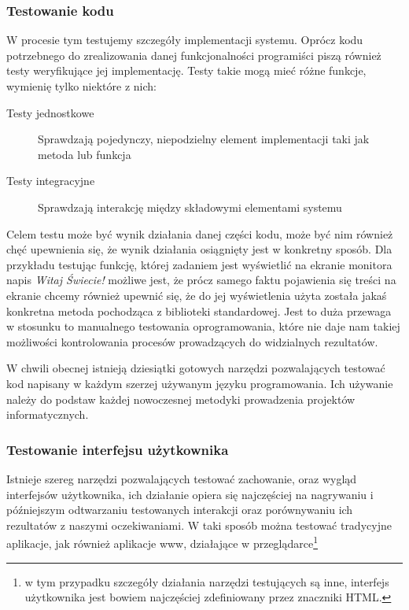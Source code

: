 	    \subsubsection{Testowanie kodu}
	    
	      W procesie tym testujemy szczegóły implementacji systemu. Oprócz kodu potrzebnego do zrealizowania danej funkcjonalności programiści piszą również testy weryfikujące jej implementację. Testy takie mogą mieć różne funkcje, wymienię tylko niektóre z nich:
	      
	      \begin{description}
	        \item[Testy jednostkowe] Sprawdzają pojedynczy, niepodzielny element implementacji taki jak metoda lub funkcja
	        \item[Testy integracyjne] Sprawdzają interakcję między składowymi elementami systemu
        \end{description}
        
        Celem testu może być wynik działania danej części kodu, może być nim również chęć upewnienia się, że wynik działania osiągnięty jest w konkretny sposób. Dla przykładu testując funkcję, której zadaniem jest wyświetlić na ekranie monitora napis \emph{Witaj Świecie!} możliwe jest, że prócz samego faktu pojawienia się treści na ekranie chcemy również upewnić się, że do jej wyświetlenia użyta została jakaś konkretna metoda pochodząca z biblioteki standardowej. Jest to duża przewaga w stosunku to manualnego testowania oprogramowania, które nie daje nam takiej możliwości kontrolowania procesów prowadzących do widzialnych rezultatów.

        W chwili obecnej istnieją dziesiątki gotowych narzędzi pozwalających testować kod napisany w każdym szerzej używanym języku programowania. Ich używanie należy do podstaw każdej nowoczesnej metodyki prowadzenia projektów informatycznych.
        
      \subsubsection{Testowanie interfejsu użytkownika}
        
        Istnieje szereg narzędzi pozwalających testować zachowanie, oraz wygląd interfejsów użytkownika, ich działanie opiera się najczęściej na nagrywaniu i późniejszym odtwarzaniu testowanych interakcji oraz porównywaniu ich rezultatów z naszymi oczekiwaniami. W taki sposób można testować tradycyjne aplikacje, jak również aplikacje www, działające w przeglądarce\footnote{w tym  przypadku szczegóły działania narzędzi testujących są inne, interfejs użytkownika jest bowiem najczęściej zdefiniowany przez znaczniki HTML.}
        

